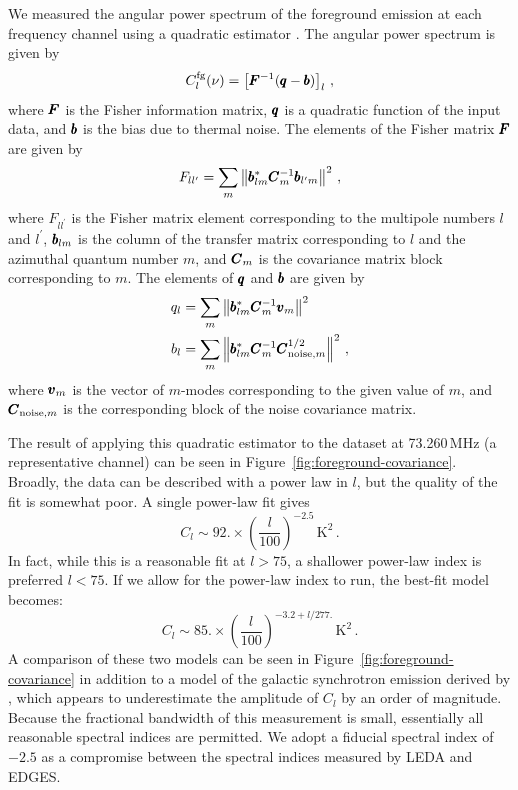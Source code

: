 \begin{bibunit}
We measured the angular power spectrum of the foreground emission at each frequency channel using a
quadratic estimator \citep{1997PhRvD..55.5895T}. The angular power spectrum is given by
\begin{equation}
    C_l^\text{fg}(\nu) = \left[\pmb F^{-1} (\pmb q - \pmb b)\right]_l\,,
\end{equation}
where $\pmb F$ is the Fisher information matrix, $\pmb q$ is a quadratic function of the input data, and
$\pmb b$ is the bias due to thermal noise.  The elements of the Fisher matrix $\pmb F$ are given by
\begin{equation}
    F_{ll^\prime} = \sum_m \left\| \pmb b_{lm}^*\pmb C_m^{-1} \pmb b_{l^\prime m} \right\|^2\,,
\end{equation}
where $F_{ll^\prime}$ is the Fisher matrix element corresponding to the multipole numbers $l$ and
$l^\prime$, $\pmb b_{lm}$ is the column of the transfer matrix corresponding to $l$ and the azimuthal
quantum number $m$, and $\pmb C_m$ is the covariance matrix block corresponding to $m$. The elements
of $\pmb q$ and $\pmb b$ are given by
\begin{align}
    q_l &= \sum_m \left\| \pmb b_{lm}^*\pmb C_m^{-1} \pmb v_m \right\|^2 \\
    b_l &= \sum_m \left\| \pmb b_{lm}^*\pmb C_m^{-1} \pmb C^{1/2}_{\text{noise}, m} \right\|^2\,,
\end{align}
where $\pmb v_m$ is the vector of $m$-modes corresponding to the given value of $m$, and $\pmb
C_{\text{noise}, m}$ is the corresponding block of the noise covariance matrix.

The result of applying this quadratic estimator to the dataset at 73.260\,MHz (a representative
channel) can be seen in Figure~\ref{fig:foreground-covariance}. Broadly, the data can be described
with a power law in $l$, but the quality of the fit is somewhat poor. A single power-law fit gives
\begin{equation}
    C_l \sim 92. \times \left(\frac{l}{100}\right)^{-2.5} \,\text{K}^2\,.
\end{equation}
In fact, while this is a reasonable fit at $l > 75$, a shallower power-law index is preferred $l <
75$. If we allow for the power-law index to run, the best-fit model becomes:
\begin{equation}\label{eq:measured-cforeground}
    C_l \sim 85. \times \left(\frac{l}{100}\right)^{-3.2 + l/277.} \,\text{K}^2\,.
\end{equation}
A comparison of these two models can be seen in Figure~\ref{fig:foreground-covariance} in addition
to a model of the galactic synchrotron emission derived by \citet{2005ApJ...625..575S}, which
appears to underestimate the amplitude of $C_l$ by an order of magnitude.  Because the fractional
bandwidth of this measurement is small, essentially all reasonable spectral indices are permitted.
We adopt a fiducial spectral index of $-2.5$ as a compromise between the spectral indices measured
by LEDA and EDGES.


\end{bibunit}
